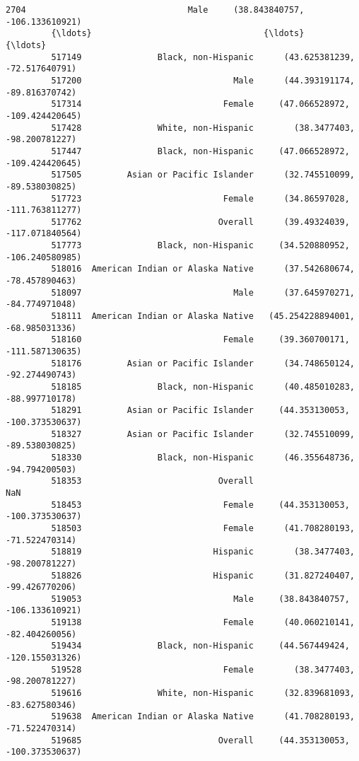 \documentclass[11pt]{article}
\begin{document}
\begin{Verbatim}[commandchars=\\\{\}]
         2704                                Male     (38.843840757, -106.133610921)   
         {\ldots}                                  {\ldots}                                {\ldots}   
         517149               Black, non-Hispanic      (43.625381239, -72.517640791)   
         517200                              Male      (44.393191174, -89.816370742)   
         517314                            Female     (47.066528972, -109.424420645)   
         517428               White, non-Hispanic        (38.3477403, -98.200781227)   
         517447               Black, non-Hispanic     (47.066528972, -109.424420645)   
         517505         Asian or Pacific Islander      (32.745510099, -89.538030825)   
         517723                            Female      (34.86597028, -111.763811277)   
         517762                           Overall      (39.49324039, -117.071840564)   
         517773               Black, non-Hispanic     (34.520880952, -106.240580985)   
         518016  American Indian or Alaska Native      (37.542680674, -78.457890463)   
         518097                              Male      (37.645970271, -84.774971048)   
         518111  American Indian or Alaska Native   (45.254228894001, -68.985031336)   
         518160                            Female     (39.360700171, -111.587130635)   
         518176         Asian or Pacific Islander      (34.748650124, -92.274490743)   
         518185               Black, non-Hispanic      (40.485010283, -88.997710178)   
         518291         Asian or Pacific Islander     (44.353130053, -100.373530637)   
         518327         Asian or Pacific Islander      (32.745510099, -89.538030825)   
         518330               Black, non-Hispanic      (46.355648736, -94.794200503)   
         518353                           Overall                                NaN   
         518453                            Female     (44.353130053, -100.373530637)   
         518503                            Female      (41.708280193, -71.522470314)   
         518819                          Hispanic        (38.3477403, -98.200781227)   
         518826                          Hispanic      (31.827240407, -99.426770206)   
         519053                              Male     (38.843840757, -106.133610921)   
         519138                            Female      (40.060210141, -82.404260056)   
         519434               Black, non-Hispanic     (44.567449424, -120.155031326)   
         519528                            Female        (38.3477403, -98.200781227)   
         519616               White, non-Hispanic      (32.839681093, -83.627580346)   
         519638  American Indian or Alaska Native      (41.708280193, -71.522470314)   
         519685                           Overall     (44.353130053, -100.373530637)   
         

\end{Verbatim}
\end{document}
